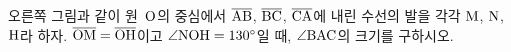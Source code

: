 \noindent\begin{minipage}[t]{0.58\linewidth}\vspace{0pt}\raggedright 오른쪽 그림과 같이 원~$\mathrm{O}$의 중심에서 $\overline{\mathrm{AB}}$, $\overline{\mathrm{BC}}$, $\overline{\mathrm{CA}}$에 내린 수선의 발을 각각 $\mathrm{M}$, $\mathrm{N}$, $\mathrm{H}$라 하자. $\overline{\mathrm{OM}}=\overline{\mathrm{OH}}$이고 $\angle\mathrm{NOH}=130^\circ$일 때, $\angle\mathrm{BAC}$의 크기를 구하시오.\end{minipage}\hfill\begin{minipage}[t]{0.4\linewidth}\vspace{0pt}\centering \resizebox{\ifdim\width>\linewidth\linewidth\else\width\fi}{!}{}\end{minipage}\par
